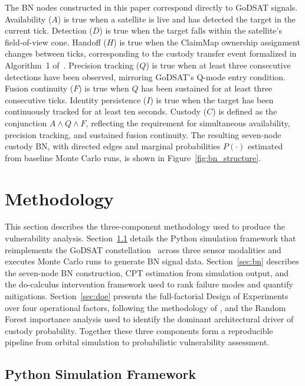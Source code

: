 \documentclass[]{spie}
\begin{document}
The BN nodes constructed in this paper correspond directly to GoDSAT signals. Availability ($A$) is true when a satellite is live and has detected the target in the current tick. Detection ($D$) is true when the target falls within the satellite's field-of-view cone. Handoff ($H$) is true when the ClaimMap ownership assignment changes between ticks, corresponding to the custody transfer event formalized in Algorithm~1 of~\cite{Saeed2026GoDSATRL}. Precision tracking ($Q$) is true when at least three consecutive detections have been observed, mirroring GoDSAT's Q-mode entry condition. Fusion continuity ($F$) is true when $Q$ has been sustained for at least three consecutive ticks. Identity persistence ($I$) is true when the target has been continuously tracked for at least ten seconds. Custody ($C$) is defined as the conjunction $A \wedge Q \wedge F$, reflecting the requirement for simultaneous availability, precision tracking, and sustained fusion continuity. The resulting seven-node custody BN, with directed edges and marginal probabilities $P(\cdot)$ estimated from 
baseline Monte Carlo runs, is shown in Figure~\ref{fig:bn_structure}.

\section{Methodology}
\label{sec:methodology}

This section describes the three-component methodology used to produce the vulnerability 
analysis. Section~\ref{sec:sim} details the Python simulation framework that reimplements 
the GoDSAT constellation~\cite{Saeed2026GoDSATRL} across three sensor modalities and executes Monte Carlo runs to generate BN signal data. Section~\ref{sec:bn} describes the seven-node BN construction, CPT estimation from simulation output, and the do-calculus intervention framework used to rank failure modes and quantify mitigations. Section~\ref{sec:doe} presents the full-factorial Design of Experiments over four operational factors, following the methodology of \cite{Saeed2025DOEFramework}, and the Random Forest importance analysis used to identify the dominant architectural driver of custody probability. Together these three components form a reproducible pipeline from orbital simulation to probabilistic vulnerability assessment.

\subsection{Python Simulation Framework}
\label{sec:sim}
\end{document}
